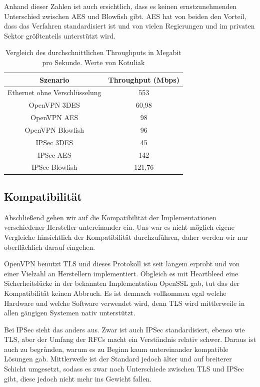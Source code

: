 \documentclass[12pt]{scrartcl}
\begin{document}
Anhand dieser Zahlen ist auch ersichtlich, dass es keinen ernstzunehmenden Unterschied zwischen AES und Blowfish gibt. AES hat von beiden den Vorteil, dass das Verfahren standardisiert ist und von vielen Regierungen und im privaten Sektor größtenteils unterstützt wird.

\begin{table}
\caption{Vergleich des durchschnittlichen Throughputs in Megabit pro Sekunde. Werte von Kotuliak\cite{Kotuliak2011}}
\label{tab:tp}
\begin{tabular}{c|c}
Szenario & Throughput (Mbps) \\
\hline
Ethernet ohne Verschlüsselung & 553 \\
OpenVPN 3DES & 60,98 \\
OpenVPN AES & 98 \\
OpenVPN Blowfish & 96 \\
IPSec 3DES & 45 \\
IPSec AES & 142 \\
IPSec Blowfish & 121,76
\end{tabular}
\end{table}

\subsection{Kompatibilität}
Abschließend gehen wir auf die Kompatibilität der Implementationen verschiedener Hersteller untereinander ein. Uns war es nicht möglich eigene Vergleiche hinsichtlich der Kompatibilität durchzuführen, daher werden wir nur oberflächlich darauf eingehen.

OpenVPN benutzt TLS und dieses Protokoll ist seit langem erprobt und von einer Vielzahl an Herstellern implementiert. Obgleich es mit Heartbleed eine Sicherheitslücke in der bekannten Implementation OpenSSL gab, tut das der Kompatibilität keinen Abbruch. Es ist demnach vollkommen egal welche Hardware und welche Software verwendet wird, denn TLS wird mittlerweile in allen gängigen Systemen nativ unterstützt.

Bei IPSec sieht das anders aus. Zwar ist auch IPSec standardisiert, ebenso wie TLS, aber der Umfang der RFCs macht ein Verständnis relativ schwer. Daraus ist auch zu begründen, warum es zu Beginn kaum untereinander kompatible Lösungen gab\cite{Alshamsi2005}. Mittlerweile ist der Standard jedoch älter und auf breiterer Schicht umgesetzt, sodass es zwar noch Unterschiede zwischen TLS und IPSec gibt, diese jedoch nicht mehr ins Gewicht fallen.
\end{document}
